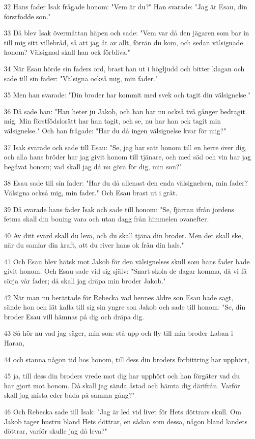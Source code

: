 \par 32 Hans fader Isak frågade honom: "Vem är du?" Han svarade: "Jag är Esau, din förstfödde son."
\par 33 Då blev Isak övermåttan häpen och sade: "Vem var då den jägaren som bar in till mig sitt villebråd, så att jag åt av allt, förrän du kom, och sedan välsignade honom? Välsignad skall han ock förbliva."
\par 34 När Esau hörde sin faders ord, brast han ut i högljudd och bitter klagan och sade till sin fader: "Välsigna också mig, min fader."
\par 35 Men han svarade: "Din broder har kommit med svek och tagit din välsignelse."
\par 36 Då sade han: "Han heter ju Jakob, och han har nu också två gånger bedragit mig. Min förstfödslorätt har han tagit, och se, nu har han ock tagit min välsignelse." Och han frågade: "Har du då ingen välsignelse kvar för mig?"
\par 37 Isak svarade och sade till Esau: "Se, jag har satt honom till en herre över dig, och alla hans bröder har jag givit honom till tjänare, och med säd och vin har jag begåvat honom; vad skall jag då nu göra för dig, min son?"
\par 38 Esau sade till sin fader: "Har du då allenast den enda välsignelsen, min fader? Välsigna också mig, min fader." Och Esau brast ut i gråt.
\par 39 Då svarade hans fader Isak och sade till honom: "Se, fjärran ifrån jordens fetma skall din boning vara och utan dagg från himmelen ovanefter.
\par 40 Av ditt svärd skall du leva, och du skall tjäna din broder. Men det skall ske, när du samlar din kraft, att du river hans ok från din hals."
\par 41 Och Esau blev hätsk mot Jakob för den välsignelses skull som hans fader hade givit honom. Och Esau sade vid sig själv: "Snart skola de dagar komma, då vi få sörja vår fader; då skall jag dräpa min broder Jakob."
\par 42 När man nu berättade för Rebecka vad hennes äldre son Esau hade sagt, sände hon och lät kalla till sig sin yngre son Jakob och sade till honom: "Se, din broder Esau vill hämnas på dig och dräpa dig.
\par 43 Så hör nu vad jag säger, min son: stå upp och fly till min broder Laban i Haran,
\par 44 och stanna någon tid hos honom, till dess din broders förbittring har upphört,
\par 45 ja, till dess din broders vrede mot dig har upphört och han förgäter vad du har gjort mot honom. Då skall jag sända åstad och hämta dig därifrån. Varför skall jag mista eder båda på samma gång?"
\par 46 Och Rebecka sade till Isak: "Jag är led vid livet för Hets döttrars skull. Om Jakob tager hustru bland Hets döttrar, en sådan som dessa, någon bland landets döttrar, varför skulle jag då leva?"

